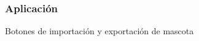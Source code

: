 \documentclass[14pt]{beamer}
\begin{document}
\begin{frame}
\frametitle{Aplicación}
Botones de importación y exportación de mascota
\begin{columns}
\begin{column}{0.5\textwidth}
\begin{center}


\end{center}
\end{column}

\end{columns}

\end{frame}
\end{document}
